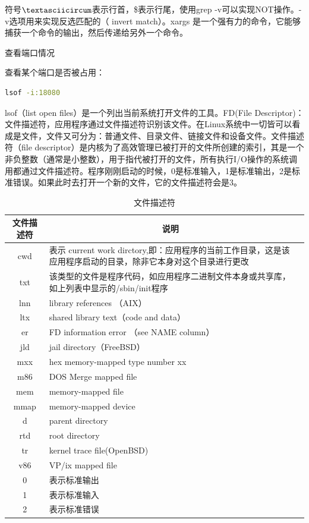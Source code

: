\documentclass[12pt]{book}
\makeatletter
\numberwithin{dummy}{section}
\theoremstyle{ocrenumbox}
\theoremstyle{blacknumex}
\theoremstyle{blacknumbox}
\theoremstyle{ocrenum}
\renewcommand\paragraph{\@startsection{paragraph}{4}{\z@}
	{-2ex \@plus-.2ex \@minus .2ex}
	{.1ex}
	{\normalfont\small\sffamily\bfseries}}
\makeatother
\begin{document}
符号$\textasciicircum$表示行首，\$表示行尾，使用grep -v可以实现NOT操作。-v选项用来实现反选匹配的（ invert match）。xargs 是一个强有力的命令，它能够捕获一个命令的输出，然后传递给另外一个命令。

\paragraph{查看端口情况}

查看某个端口是否被占用：

\begin{lstlisting}[language=Bash]
lsof -i:18080
\end{lstlisting}

lsof（list open files）是一个列出当前系统打开文件的工具。FD(File Descriptor)：文件描述符，应用程序通过文件描述符识别该文件。在Linux系统中一切皆可以看成是文件，文件又可分为：普通文件、目录文件、链接文件和设备文件。文件描述符（file descriptor）是内核为了高效管理已被打开的文件所创建的索引，其是一个非负整数（通常是小整数），用于指代被打开的文件，所有执行I/O操作的系统调用都通过文件描述符。程序刚刚启动的时候，0是标准输入，1是标准输出，2是标准错误。如果此时去打开一个新的文件，它的文件描述符会是3。

\begin{table}
	\caption{文件描述符}
	\label{table:filedescriptor}
	\bigskip
	\begin{tabular}{cp{12cm}c}
		\hline
		\multirow{1}{*}{文件描述符}
		& \multicolumn{1}{c}{说明}  \\
		\hline			
		cwd & 表示 current  work dirctory,即：应用程序的当前工作目录，这是该应用程序启动的目录，除非它本身对这个目录进行更改 \\
		txt & 该类型的文件是程序代码，如应用程序二进制文件本身或共享库，如上列表中显示的/sbin/init程序 \\
		lnn & library references （AIX） \\
		ltx & shared  library text（code and  data） \\
		er & FD  information  error （see  NAME  column） \\
		jld & jail  directory（FreeBSD） \\
		mxx & hex  memory-mapped  type number  xx\\
		m86 & DOS  Merge  mapped  file\\
		mem & memory-mapped  file\\
		mmap & memory-mapped device\\
		d & parent  directory\\
		rtd & root  directory\\
		tr & kernel  trace file(OpenBSD)\\
		v86 & VP/ix  mapped  file\\
		0 & 表示标准输出\\
		1 & 表示标准输入\\
		2 & 表示标准错误\\	
		\hline
	\end{tabular}
\end{table}
\end{document}

